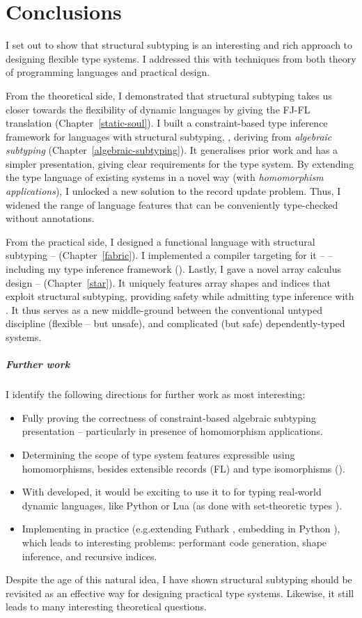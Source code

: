 \chapter{Conclusions}
\label{conclusions}

I set out to show that structural subtyping is an interesting and rich approach to designing flexible type systems. I addressed this with techniques from both theory of programming languages and practical design.

From the theoretical side, I demonstrated that structural subtyping takes us closer towards the flexibility of dynamic languages by giving the FJ-FL translation (Chapter~\ref{static-soul}). 
I built a constraint-based type inference framework for languages with structural subtyping, \textbf{\inference{}}, deriving from \emph{algebraic subtyping} (Chapter~\ref{algebraic-subtyping}). 
It generalises prior work and has a simpler presentation, giving clear requirements for the type system.
By extending the type language of existing systems in a novel way (with \emph{homomorphism applications}), I unlocked a new solution to the record update problem. 
Thus, I widened the range of language features that can be conveniently type-checked without annotations.

From the practical side, I designed a functional language with structural subtyping -- \textbf{\fabric} (Chapter~\ref{fabric}). 
I implemented a compiler targeting \wasm{} for it -- \compiler{} -- including my type inference framework (\inference{}).
Lastly, I gave a novel array calculus design -- \textbf{\starr{}} (Chapter~\ref{star}). It uniquely features array shapes and indices that exploit structural subtyping, providing safety while admitting type inference with \inference{}. It thus serves as a new middle-ground between the conventional untyped discipline (flexible -- but unsafe), and complicated (but safe) dependently-typed systems. 

\paragraph{Further work}
I identify the following directions for further work as most interesting: \begin{itemize}
    \item Fully proving the correctness of constraint-based algebraic subtyping presentation -- particularly in presence of homomorphism applications. 
    \item Determining the scope of type system features expressible using homomorphisms, besides extensible records (FL) and type isomorphisms (\starr{}).
    \item With \inference{} developed, it would be exciting to use it to for typing real-world dynamic languages, like Python or Lua (as done with set-theoretic types \cite{set-theoretic-types-for-elixir, set-theoretic-types-for-erlang, castagna-dynamic}).
    \item Implementing \starr{} in practice (e.g.\@ extending Futhark \cite{futhark}, embedding in Python \cite{ein}), which leads to interesting problems: performant code generation, shape inference, and recursive indices.
\end{itemize}

Despite the age of this natural idea, I have shown structural subtyping should be revisited as an effective way for designing practical type systems. Likewise, it still leads to many interesting theoretical questions.